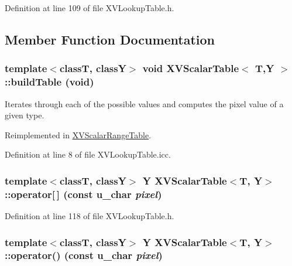 Definition at line 109 of file XVLookup\-Table.h.

\subsection{Member Function Documentation}
\label{XVScalarTable_a1}
\hypertarget{class_XVScalarTable_a1}{
\subsubsection[buildTable]{\setlength{\rightskip}{0pt plus 5cm}template$<$classT, classY$>$ void XVScalar\-Table$<$ T,Y $>$::build\-Table (void)}}


Iterates through each of the possible values and computes the pixel value of a given type.



Reimplemented in \hyperlink{class_XVScalarRangeTable_a3}{XVScalar\-Range\-Table}.

Definition at line 8 of file XVLookup\-Table.icc.\label{XVScalarTable_a2}
\hypertarget{class_XVScalarTable_a2}{
\subsubsection[operator{}]{\setlength{\rightskip}{0pt plus 5cm}template$<$classT, classY$>$ Y XVScalar\-Table$<$T, Y$>$::operator\mbox{[}$\,$\mbox{]} (const u\_\-char {\em pixel})}}




Definition at line 118 of file XVLookup\-Table.h.\label{XVScalarTable_a3}
\hypertarget{class_XVScalarTable_a3}{
\subsubsection[operator()]{\setlength{\rightskip}{0pt plus 5cm}template$<$classT, classY$>$ Y XVScalar\-Table$<$T, Y$>$::operator() (const u\_\-char {\em pixel})}}




